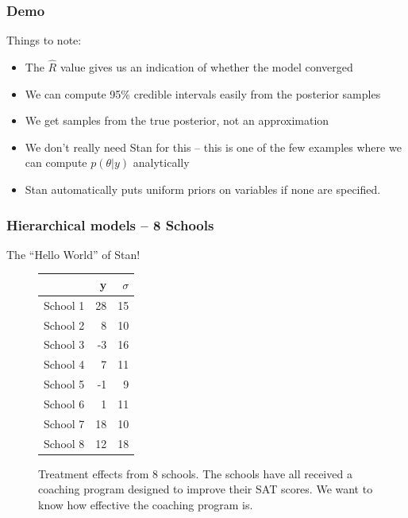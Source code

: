 \documentclass{beamer}
\begin{document}
\begin{frame}
	\frametitle{Demo}
	Things to note:
	\begin{itemize}
		\item The $\hat{R}$ value gives us an indication of whether the model converged
		\item We can compute 95\% credible intervals easily from the posterior samples
		\item We get samples from the true posterior, not an approximation
		\item We don't really need Stan for this -- this is one of the few examples where we can compute $p(\theta | y)$ analytically
		\item Stan automatically puts uniform priors on variables if none are specified.
	\end{itemize}
\end{frame}

\begin{frame}
	\frametitle{Hierarchical models -- 8 Schools}
	The ``Hello World'' of Stan!
\centering
\begin{figure}
\begin{tabular}{lrr}
\toprule
{} &   y &  $\sigma$ \\
\midrule
School 1 &  28 &     15 \\
School 2 &   8 &     10 \\
School 3 &  -3 &     16 \\
School 4 &   7 &     11 \\
School 5 &  -1 &      9 \\
School 6 &   1 &     11 \\
School 7 &  18 &     10 \\
School 8 &  12 &     18 \\
\bottomrule
\end{tabular}
\caption{Treatment effects from 8 schools. The schools have all received a coaching program designed to improve their SAT scores. We want to know how effective the coaching program is.}
\end{figure}
\end{frame}
\end{document}
